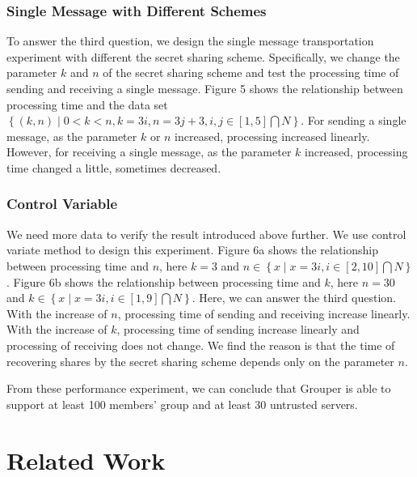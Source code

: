 \documentclass[twocolumn,10pt]{article}
\begin{document}
\subsubsection{Single Message with Different Schemes}

To answer the third question, we design the single message transportation experiment with different the secret sharing scheme.
Specifically, we change the parameter ${k}$  and ${n}$ of the secret sharing scheme and test the processing time of sending and receiving a single message.
Figure 5 shows the relationship between processing time and the data set ${\left \{ \left (k, n \right )\mid 0< k < n, k=3i, n=3j+3, i, j\in\left [ 1,5 \right ]\bigcap N\right \}}$.
For sending a single message, as the parameter ${k}$ or ${n}$ increased, processing increased linearly.
However, for receiving a single message, as the parameter ${k}$ increased, processing time  changed a little, sometimes decreased.

\subsubsection{Control Variable}

We need more data to verify the result introduced above further. 
We use control variate method to design this experiment.
Figure 6a shows the relationship between processing time and ${n}$, here ${k=3}$ and ${n \in \left \{ x\mid x=3i, i \in \left [ 2, 10 \right ] \bigcap N \right \}}$. 
Figure 6b shows the relationship between processing time and ${k}$, here ${n=30}$ and ${k \in \left \{ x\mid x=3i, i \in \left [ 1, 9 \right ] \bigcap N \right \}}$. 
Here, we can answer the third question.
With the increase of ${n}$, processing time of sending and receiving increase linearly.
With the increase of ${k}$, processing time of sending increase linearly and processing of receiving does not change.
We find the reason is that the time of recovering shares by the secret sharing scheme depends only on the parameter ${n}$.

From these performance experiment, we can conclude that Grouper is able to support at least 100 members' group and at least 30 untrusted servers.

\section{Related Work}
\end{document}

